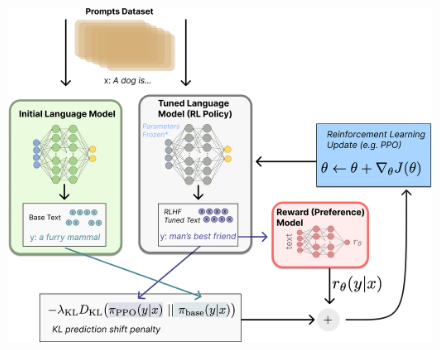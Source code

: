 \begin{description}
        \begin{figure}[H]
            \centering
            \includegraphics[width=0.6\linewidth]{./img/rlhf.png}
        \end{figure}
\end{description}